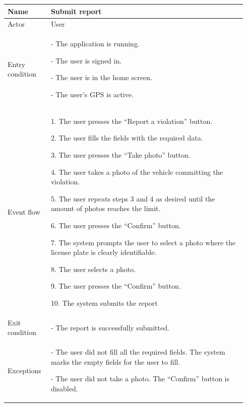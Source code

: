 \begin{table}[H]
\begin{tabular}{|p{0.17\linewidth}|p{0.77\linewidth}|}
\hline
Name            & Submit report
\\ \hline

Actor           & User
\\ \hline

Entry condition &
    - The application is running.

    - The user is signed in.

    - The user is in the home screen.

    - The user’s GPS is active.
\\ \hline
Event flow      & 
    1. The user presses the “Report a violation” button.

    2. The user fills the fields with the required data.

    3. The user presses the “Take photo” button.

    4. The user takes a photo of the vehicle committing the violation.

    5. The user repeats steps 3 and 4 as desired until the amount of photos reaches the limit.

    6. The user presses the “Confirm” button.

    7. The system prompts the user to select a photo where the license plate is clearly identifiable.

    8. The user selects a photo.

    9. The user presses the “Confirm” button.
    
    10. The system submits the report
\\ \hline
Exit condition  & 
    - The report is successfully submitted.
\\ \hline
Exceptions      &
    - The user did not fill all the required fields. The system marks the empty fields for the user to fill.

    - The user did not take a photo. The “Confirm” button is disabled.
\\ \hline
\end{tabular}
\end{table}

